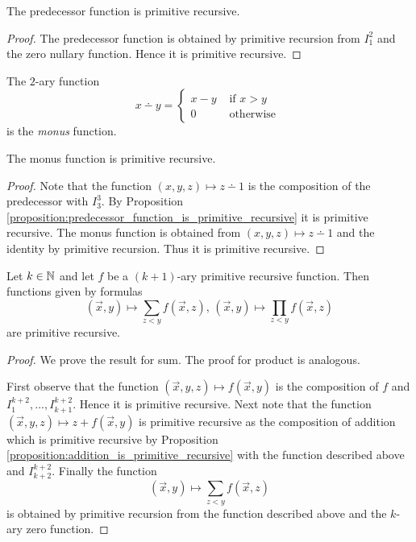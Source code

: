 \documentclass[10pt]{amsart}
\begin{document}
\begin{proposition}\label{proposition:predecessor_function_is_primitive_recursive}
	The predecessor function is primitive recursive.
\end{proposition}
\begin{proof}
	The predecessor function is obtained by primitive recursion from $I^2_1$ and the zero nullary function. Hence it is primitive recursive.
\end{proof}

\begin{definition}
	The $2$-ary function
	$$x \dotminus y = \begin{cases}
			x - y & \mbox{ if }x > y   \\
			0     & \mbox{ otherwise }
		\end{cases}$$
	is the \textit{monus} function.
\end{definition}

\begin{proposition}\label{proposition:monus_function_is_primitive_recursive}
	The monus function is primitive recursive.
\end{proposition}
\begin{proof}
	Note that the function $(x,y,z) \mapsto z\dotminus 1$ is the composition of the predecessor with $I^3_3$. By Proposition \ref{proposition:predecessor_function_is_primitive_recursive} it is primitive recursive. The monus function is obtained from $(x,y,z)\mapsto z \dotminus 1$ and the identity by primitive recursion. Thus it is primitive recursive.
\end{proof}

\begin{proposition}\label{proposition:fold_mechanism_for_sum_and_product_is_primitive_recursive}
	Let $k\in {\mathbb N}$ and let $f$ be a $(k+1)$-ary primitive recursive function. Then functions given by formulas
	$$(\vec{x},y)\mapsto \sum_{z < y}f(\vec{x},z),\,(\vec{x},y) \mapsto \prod_{z < y}f(\vec{x},z)$$
	are primitive recursive.
\end{proposition}
\begin{proof}
	We prove the result for sum. The proof for product is analogous.

	First observe that the function $(\vec{x},y,z) \mapsto f(\vec{x},y)$ is the composition of $f$ and $I^{k+2}_1,...,I^{k+2}_{k+1}$. Hence it is primitive recursive. Next note that the function $(\vec{x},y,z) \mapsto z + f(\vec{x},y)$ is primitive recursive as the composition of addition which is primitive recursive by Proposition \ref{proposition:addition_is_primitive_recursive} with the function described above and $I^{k+2}_{k+2}$. Finally the function
	$$(\vec{x},y)\mapsto \sum_{z < y}f(\vec{x},z)$$
	is obtained by primitive recursion from the function described above and the $k$-ary zero function.
\end{proof}
\end{document}
